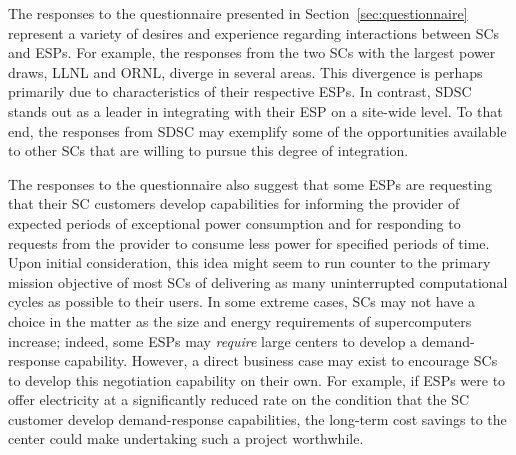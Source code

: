The responses to the questionnaire presented in
Section~\ref{sec:questionnaire} represent a variety of desires and
experience regarding interactions between SCs and
ESPs. For example, the responses from the two SCs
with the largest power draws, LLNL and ORNL, diverge in several
areas. This divergence is perhaps primarily due to characteristics of
their respective ESPs. In contrast, SDSC stands out as a leader in integrating
with their ESP on a site-wide level. To that end, the
responses from SDSC may exemplify some of the opportunities available
to other SCs that are willing to pursue this degree
of integration.

The responses to the questionnaire also suggest that some ESPs are requesting that their SC customers
develop capabilities for informing the provider of expected periods of
exceptional power consumption and for responding to requests from the
provider to consume less power for specified periods of time. Upon
initial consideration, this idea might seem to run counter to the
primary mission objective of most SCs of delivering
as many uninterrupted computational cycles as possible to their users.
In some extreme cases, SCs may not have a choice
in the matter as the size and energy requirements of supercomputers
increase; indeed, some ESPs may \textit{require} large
centers to develop a demand-response capability. However, a direct
business case may exist to encourage SCs to develop
this negotiation capability on their own. For example, if ESPs were to offer electricity at a significantly reduced rate
on the condition that the SC customer develop
demand-response capabilities, the long-term cost savings to the
center could make undertaking such a project worthwhile.

